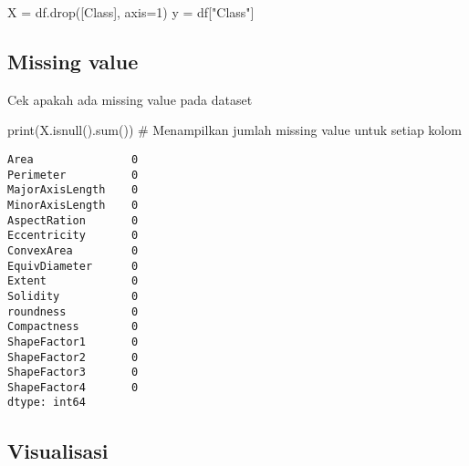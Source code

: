\documentclass[
  letterpaper,
]{krantz}
\makeatletter
\newenvironment{Shaded}{\begin{snugshade}}{\end{snugshade}}
\newcommand{\BuiltInTok}[1]{\textcolor[rgb]{0.00,0.23,0.31}{#1}}
\newcommand{\CommentTok}[1]{\textcolor[rgb]{0.37,0.37,0.37}{#1}}
\newcommand{\DecValTok}[1]{\textcolor[rgb]{0.68,0.00,0.00}{#1}}
\newcommand{\NormalTok}[1]{\textcolor[rgb]{0.00,0.23,0.31}{#1}}
\newcommand{\OperatorTok}[1]{\textcolor[rgb]{0.37,0.37,0.37}{#1}}
\newcommand{\StringTok}[1]{\textcolor[rgb]{0.13,0.47,0.30}{#1}}
\newenvironment{kframe}{%
\medskip{}
\setlength{\fboxsep}{.8em}
 \def\at@end@of@kframe{}%
 \ifinner\ifhmode%
  \def\at@end@of@kframe{\end{minipage}}%
  \begin{minipage}{\columnwidth}%
 \fi\fi%
 \def\FrameCommand##1{\hskip\@totalleftmargin \hskip-\fboxsep
 \colorbox{shadecolor}{##1}\hskip-\fboxsep
     \hskip-\linewidth \hskip-\@totalleftmargin \hskip\columnwidth}%
 \MakeFramed {\advance\hsize-\width
   \@totalleftmargin\z@ \linewidth\hsize
   \@setminipage}}%
 {\par\unskip\endMakeFramed%
 \at@end@of@kframe}
\renewenvironment{Shaded}{\begin{kframe}}{\end{kframe}}
\makeatother
\begin{document}
\begin{Shaded}
\begin{Highlighting}[]
\NormalTok{X }\OperatorTok{=}\NormalTok{ df.drop([}\StringTok{\textquotesingle{}Class\textquotesingle{}}\NormalTok{], axis}\OperatorTok{=}\DecValTok{1}\NormalTok{)}
\NormalTok{y }\OperatorTok{=}\NormalTok{ df[}\StringTok{"Class"}\NormalTok{]}
\end{Highlighting}
\end{Shaded}

\hypertarget{missing-value}{%
\subsection{Missing value}\label{missing-value}}

Cek apakah ada missing value pada dataset

\begin{Shaded}
\begin{Highlighting}[]
\BuiltInTok{print}\NormalTok{(X.isnull().}\BuiltInTok{sum}\NormalTok{())  }\CommentTok{\# Menampilkan jumlah missing value untuk setiap kolom}
\end{Highlighting}
\end{Shaded}

\begin{verbatim}
Area               0
Perimeter          0
MajorAxisLength    0
MinorAxisLength    0
AspectRation       0
Eccentricity       0
ConvexArea         0
EquivDiameter      0
Extent             0
Solidity           0
roundness          0
Compactness        0
ShapeFactor1       0
ShapeFactor2       0
ShapeFactor3       0
ShapeFactor4       0
dtype: int64
\end{verbatim}

\hypertarget{visualisasi}{%
\subsection{Visualisasi}\label{visualisasi}}
\end{document}
